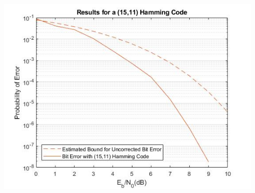 \documentclass{article}
\begin{document}
\begin{enumerate}
\begin{center}\includegraphics[width=\textwidth]{BPSKProbabilityError1511Hamming.jpg}\end{center}
\end{enumerate}
\end{document}
